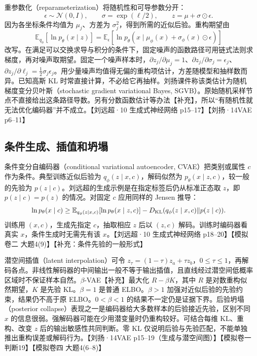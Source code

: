 \documentclass[UTF8,a4paper,zihao=-4,fontset=fandol]{ctexrep}
\begin{document}
重参数化（reparameterization）将随机性和可导参数分开：
\[
 \epsilon\sim\mathcal N(0,I),\qquad
 \sigma=\exp(\ell/2),\qquad z=\mu+\sigma\odot\epsilon .
\]
因为各坐标条件均值为 $\mu_j$、方差为 $\sigma_j^2$，得到所需的近似后验。重构期望由
\[
 \mathbb E_{q_\phi}[\ln p_\theta(x\mid z)]
 =\mathbb E_{\epsilon}[\ln p_\theta(x\mid\mu_\phi(x)+\sigma_\phi(x)\odot\epsilon)]
\]
改写。在满足可以交换求导与积分的条件下，固定噪声的函数路径可用链式法则求梯度，再对噪声取期望。固定一个噪声样本时，$\partial z_j/\partial\mu_j=1$、$\partial z_j/\partial\sigma_j=\epsilon_j$、$\partial z_j/\partial\ell_j=\frac12\sigma_j\epsilon_j$。用少量噪声均值得无偏的重构项估计，方差随模型和抽样数而异。已知高斯 KL 时常直接计算，不必给它再抽样。刘扬课件称该类估计为随机梯度变分贝叶斯（stochastic gradient variational Bayes, SGVB）。原始随机采样节点不直接给出这条路径导数。另有分数函数估计等办法【补充】，所以“有随机性就无法优化编码器”并不成立。【刘远超·10 生成式神经网络 p15--17】【刘扬·14VAE p6--11】

\subsection*{条件生成、插值和坍塌}

条件变分自编码器（conditional variational autoencoder, CVAE）把类别或属性 $c$ 作为条件。典型训练近似后验为 $q_\phi(z\mid x,c)$，解码似然为 $p_\theta(x\mid z,c)$，较一般的先验为 $p(z\mid c)$。刘远超的生成示例是在指定标签后仍从标准正态取 $z$，即 $p(z\mid c)=p(z)$ 的情况。对固定 $c$ 应用同样的 Jensen 推导：
\[
 \ln p_\theta(x\mid c)\ge
 \mathbb E_{q_\phi(z\mid x,c)}[\ln p_\theta(x\mid z,c)]
 -D_{\rm KL}(q_\phi(z\mid x,c)\|p(z\mid c)).
\]
训练用 $(x,c)$，生成先指定 $c$，抽取相应 $z$ 后以 $(z,c)$ 解码。训练时编码器看真实 $x$，条件生成时无需先有该 $x$。【刘远超·10 生成式神经网络 p18--20】【模拟卷二 大题4(9)】【补充：条件先验的一般形式】

潜空间插值（latent interpolation）可令 $z_\tau=(1-\tau)z_a+\tau z_b$，$0\le\tau\le1$，再解码各点。非线性解码器的中间输出一般不等于输出插值，且直线经过潜空间低概率区域时不保证样本自然。$\beta$-VAE【补充】最大化 $R-\beta K$，其中 $R$ 是对数重构似然期望，$K$ 是先验 KL。$\beta=1$ 是普通 ELBO。$\beta>1$ 加强对近似后验的先验约束，结果仍不高于原 ELBO。$0<\beta<1$ 的结果不一定仍是证据下界。后验坍塌（posterior collapse）表现之一是编码器给大多数样本的后验接近先验，区别不同 $x$ 的信息很弱。强解码器可能在少用潜变量时仍重构较好。可结合每维 KL、重构、改变 $z$ 后的输出敏感性共同判断。零 KL 仅说明后验与先验匹配，不能单独推出重构误差或解码行为。【刘扬·14VAE p15--19（生成与潜空间图）】【模拟卷一 判断19】【模拟卷四 大题4(6--8)】
\end{document}
